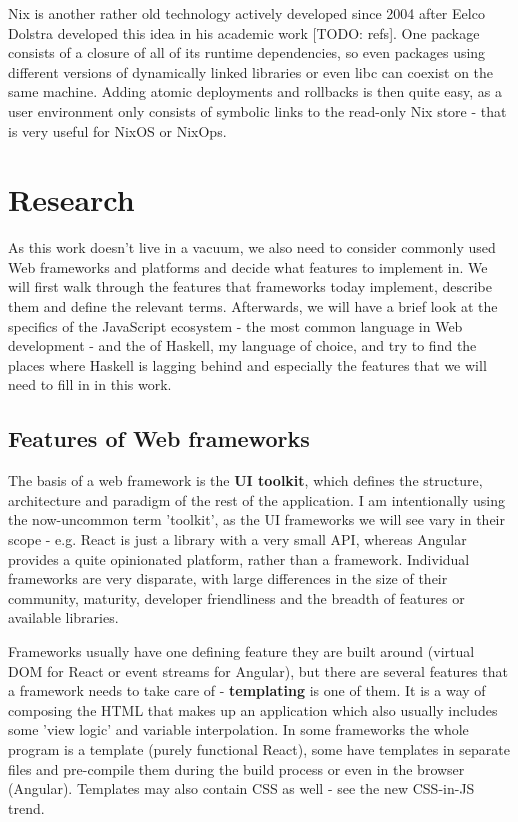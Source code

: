 \documentclass[english,odsaz]{fitthesis}
\begin{document}
Nix is another rather old technology actively developed since 2004 after Eelco
Dolstra developed this idea in his academic work [TODO: refs]. One package
consists of a closure of all of its runtime dependencies, so even packages using
different versions of dynamically linked libraries or even libc can coexist on
the same machine. Adding atomic deployments and rollbacks is then quite easy, as
a user environment only consists of symbolic links to the read-only Nix store -
that is very useful for NixOS or NixOps.

\chapter{Research}
\label{sec:org46bced6}
As this work doesn't live in a vacuum, we also need to consider commonly used
Web frameworks and platforms and decide what features to implement in. We will
first walk through the features that frameworks today implement, describe them
and define the relevant terms. Afterwards, we will have a brief look at the
specifics of the JavaScript ecosystem - the most common language in Web
development - and the of Haskell, my language of choice, and try to find the
places where Haskell is lagging behind and especially the features that we will
need to fill in in this work.

\section{Features of Web frameworks}
\label{sec:org3fd155c}
The basis of a web framework is the \textbf{UI toolkit}, which defines the structure,
architecture and paradigm of the rest of the application. I am intentionally
using the now-uncommon term 'toolkit', as the UI frameworks we will see vary in
their scope - e.g. React is just a library with a very small API, whereas
Angular provides a quite opinionated platform, rather than a
framework. Individual frameworks are very disparate, with large differences in
the size of their community, maturity, developer friendliness and the breadth of
features or available libraries.

Frameworks usually have one defining feature they are built around (virtual DOM
for React or event streams for Angular), but there are several features that a
framework needs to take care of - \textbf{templating} is one of them. It is a way of
composing the HTML that makes up an application which also usually includes some
'view logic' and variable interpolation. In some frameworks the whole program is
a template (purely functional React), some have templates in separate files and
pre-compile them during the build process or even in the browser
(Angular). Templates may also contain CSS as well - see the new CSS-in-JS trend.
\end{document}

